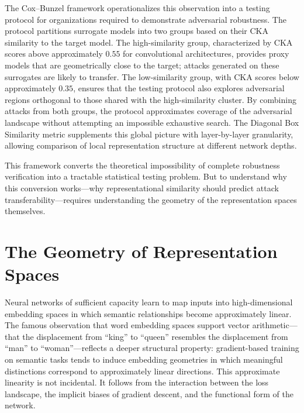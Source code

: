 \documentclass[12pt,a4paper]{article}
\theoremstyle{plain}
\theoremstyle{definition}
\begin{document}
The Cox--Bunzel framework operationalizes this observation into a testing protocol for organizations required to demonstrate adversarial robustness. The protocol partitions surrogate models into two groups based on their CKA similarity to the target model. The high-similarity group, characterized by CKA scores above approximately $0.55$ for convolutional architectures, provides proxy models that are geometrically close to the target; attacks generated on these surrogates are likely to transfer. The low-similarity group, with CKA scores below approximately $0.35$, ensures that the testing protocol also explores adversarial regions orthogonal to those shared with the high-similarity cluster. By combining attacks from both groups, the protocol approximates coverage of the adversarial landscape without attempting an impossible exhaustive search. The Diagonal Box Similarity metric supplements this global picture with layer-by-layer granularity, allowing comparison of local representation structure at different network depths.

This framework converts the theoretical impossibility of complete robustness verification into a tractable statistical testing problem. But to understand why this conversion works---why representational similarity should predict attack transferability---requires understanding the geometry of the representation spaces themselves.

\section{The Geometry of Representation Spaces}

Neural networks of sufficient capacity learn to map inputs into high-dimensional embedding spaces in which semantic relationships become approximately linear. The famous observation that word embedding spaces support vector arithmetic---that the displacement from ``king'' to ``queen'' resembles the displacement from ``man'' to ``woman''---reflects a deeper structural property: gradient-based training on semantic tasks tends to induce embedding geometries in which meaningful distinctions correspond to approximately linear directions. This approximate linearity is not incidental. It follows from the interaction between the loss landscape, the implicit biases of gradient descent, and the functional form of the network.
\end{document}
